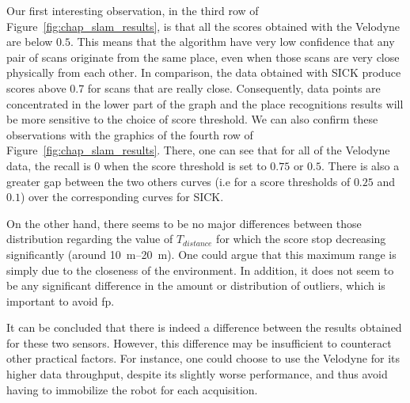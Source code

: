 Our first interesting observation, in the third row of Figure~\ref{fig:chap_slam_results}, is that all the scores obtained with the Velodyne are below $0.5$. This means that the algorithm have very low confidence that any pair of scans originate from the same place, even when those scans are very close physically from each other. In comparison, the data obtained with SICK produce scores above 0.7 for scans that are really close. Consequently, data points are concentrated in the lower part of the graph and the place recognitions results will be more sensitive to the choice of score threshold. We can also confirm these observations with the graphics of the fourth row of Figure~\ref{fig:chap_slam_results}. There, one can see that for all of the Velodyne data, the recall is 0 when the score threshold is set to $0.75$ or $0.5$. There is also a greater gap between the two others curves (i.e for a score thresholds of $0.25$ and $0.1$) over the corresponding curves for SICK.

On the other hand, there seems to be no major differences between those distribution regarding the value of $T_{distance}$ for which the score stop decreasing significantly (around \SIrange{10}{20}{\meter}). One could argue that this maximum range is simply due to the closeness of the environment. In addition, it does not seem to be any significant difference in the amount or distribution of outliers, which is important to avoid \gls*{fp}.

It can be concluded that there is indeed a difference between the results obtained for these two sensors. However, this difference may be insufficient to counteract other practical factors. For instance, one could choose to use the Velodyne for its higher data throughput, despite its slightly worse performance, and thus avoid having to immobilize the robot for each acquisition.

